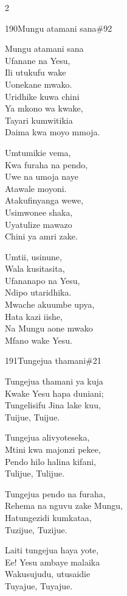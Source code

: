 \documentclass{article}
\begin{document}
\begin{multicols}{2}
\begin{hymn}{190}{Mungu atamani sana}{\#92}
\begin{stanza}
Mungu atamani sana\\
Ufanane na Yesu,\\
Ili utukufu wake\\
Uonekane mwako.\\
Uridhike kuwa chini\\
Ya mkono wa kwake,\\
Tayari kumwitikia\\
Daima kwa moyo mmoja.
\end{stanza}
\begin{stanza}
Umtumikie vema,\\
Kwa furaha na pendo,\\
Uwe na umoja naye\\
Atawale moyoni.\\
Atakufinyanga wewe,\\
Usimwonee shaka,\\
Uyatulize mawazo\\
Chini ya amri zake.
\end{stanza}
\begin{stanza}
Umtii, usinune,\\
Wala kusitasita,\\
Ufananapo na Yesu,\\
Ndipo utaridhika.\\
Mwache akuumbe upya,\\
Hata kazi iishe,\\
Na Mungu aone mwako\\
Mfano wake Yesu.
\end{stanza}
\end{hymn}

\begin{hymn}{191}{Tungejua thamani}{\#21}
\begin{stanza}
Tungejua thamani ya kuja\\
Kwake Yesu hapa duniani;\\
Tungelisifu Jina lake kuu,\\
Tuijue, Tuijue.
\end{stanza}
\begin{stanza}
Tungejua alivyoteseka,\\
Mtini kwa majonzi pekee,\\
Pendo hilo halina kifani,\\
Tulijue, Tulijue.
\end{stanza}
\begin{stanza}
Tungejua pendo na furaha,\\
Rehema na nguvu zake Mungu,\\
Hatungezidi kumkataa,\\
Tuzijue, Tuzijue.
\end{stanza}
\begin{stanza}
Laiti tungejua haya yote,\\
Ee! Yesu ambaye malaika\\
Wakusujudu, utusaidie\\
Tuyajue, Tuyajue.
\end{stanza}
\end{hymn}


\end{multicols}
\end{document}
